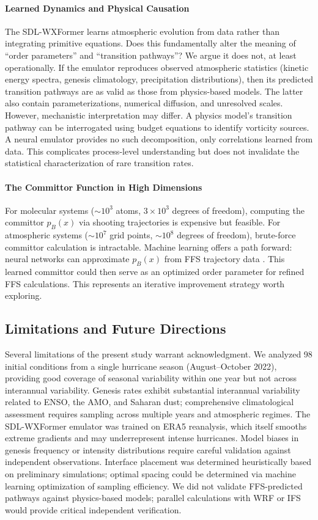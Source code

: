 \documentclass[11pt]{article}
\begin{document}
\paragraph{Learned Dynamics and Physical Causation}
The SDL-WXFormer learns atmospheric evolution from data rather than integrating primitive equations. Does this fundamentally alter the meaning of ``order parameters'' and ``transition pathways''? We argue it does not, at least operationally. If the emulator reproduces observed atmospheric statistics (kinetic energy spectra, genesis climatology, precipitation distributions), then its predicted transition pathways are as valid as those from physics-based models. The latter also contain parameterizations, numerical diffusion, and unresolved scales. However, mechanistic interpretation may differ. A physics model's transition pathway can be interrogated using budget equations to identify vorticity sources. A neural emulator provides no such decomposition, only correlations learned from data. This complicates process-level understanding but does not invalidate the statistical characterization of rare transition rates.

\paragraph{The Committor Function in High Dimensions}
For molecular systems ($\sim 10^3$ atoms, $3 \times 10^3$ degrees of freedom), computing the committor $p_B(x)$ via shooting trajectories is expensive but feasible. For atmospheric systems ($\sim 10^7$ grid points, $\sim 10^8$ degrees of freedom), brute-force committor calculation is intractable. Machine learning offers a path forward: neural networks can approximate $p_B(x)$ from FFS trajectory data \citep{rotskoff2018machine}. This learned committor could then serve as an optimized order parameter for refined FFS calculations. This represents an iterative improvement strategy worth exploring.

\subsection{Limitations and Future Directions}

Several limitations of the present study warrant acknowledgment. We analyzed 98 initial conditions from a single hurricane season (August--October 2022), providing good coverage of seasonal variability within one year but not across interannual variability. Genesis rates exhibit substantial interannual variability related to ENSO, the AMO, and Saharan dust; comprehensive climatological assessment requires sampling across multiple years and atmospheric regimes. The SDL-WXFormer emulator was trained on ERA5 reanalysis, which itself smooths extreme gradients and may underrepresent intense hurricanes. Model biases in genesis frequency or intensity distributions require careful validation against independent observations. Interface placement was determined heuristically based on preliminary simulations; optimal spacing could be determined via machine learning optimization of sampling efficiency. We did not validate FFS-predicted pathways against physics-based models; parallel calculations with WRF or IFS would provide critical independent verification.
\end{document}

